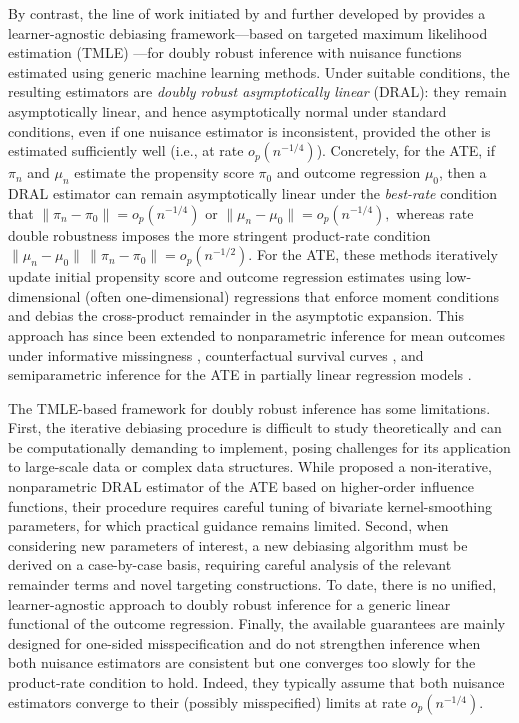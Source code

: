 \documentclass[11pt]{article}
\theoremstyle{plain}
\begin{document}
By contrast, the line of work initiated by \cite{van2014targeted} and further developed by \cite{benkeser2017doubly} provides a learner-agnostic debiasing framework---based on targeted maximum likelihood estimation (TMLE) \citep{vanderLaanRose2011}---for doubly robust inference with nuisance functions estimated using generic machine learning methods. Under suitable conditions, the resulting estimators are \emph{doubly robust asymptotically linear} (DRAL): they remain asymptotically linear, and hence asymptotically normal under standard conditions, even if one nuisance estimator is inconsistent, provided the other is estimated sufficiently well (i.e., at rate \(o_p(n^{-1/4})\)). Concretely, for the  ATE, if \(\pi_n\) and \(\mu_n\) estimate the propensity score \(\pi_0\) and outcome regression \(\mu_0\), then a DRAL estimator can remain asymptotically linear under the \emph{best-rate} condition that $\|\pi_n - \pi_0\| = o_p(n^{-1/4})$ or $
\|\mu_n - \mu_0\| = o_p(n^{-1/4}),$
whereas rate double robustness imposes the more stringent product-rate condition $\|\mu_n - \mu_0\| \, \|\pi_n - \pi_0\| = o_p(n^{-1/2}).$
For the ATE, these methods iteratively update initial propensity score and
outcome regression estimates using low-dimensional (often one-dimensional)
regressions that enforce moment conditions and debias the cross-product
remainder in the asymptotic expansion. This approach has since been extended to nonparametric inference for mean outcomes under informative missingness \citep{diaz2017doubly}, counterfactual survival curves \citep{diaz2019statistical}, and semiparametric inference for the ATE in partially linear regression models \citep{dukes2024doubly}.


 


The TMLE-based framework for doubly robust inference has some limitations.
First, the iterative debiasing procedure is difficult to study theoretically
and can be computationally demanding to implement, posing challenges for its
application to large-scale data or complex data structures. While \cite{bonvini2024doubly} proposed a non-iterative, nonparametric DRAL
estimator of the ATE based on higher-order influence functions, their procedure
requires careful tuning of bivariate kernel-smoothing parameters, for which
practical guidance remains limited. Second, when considering new
parameters of interest, a new debiasing algorithm must be derived on a
case-by-case basis, requiring careful analysis of the relevant remainder terms
and novel targeting constructions. To date, there is no unified, learner-agnostic approach to doubly robust
inference for a generic linear functional of the outcome regression. Finally, the available guarantees are mainly designed for
one-sided misspecification and do not strengthen inference when both nuisance
estimators are consistent but one converges too slowly for the product-rate
condition to hold. Indeed, they typically assume that both nuisance estimators converge to their
(possibly misspecified) limits at rate \(o_p(n^{-1/4})\).
\end{document}
